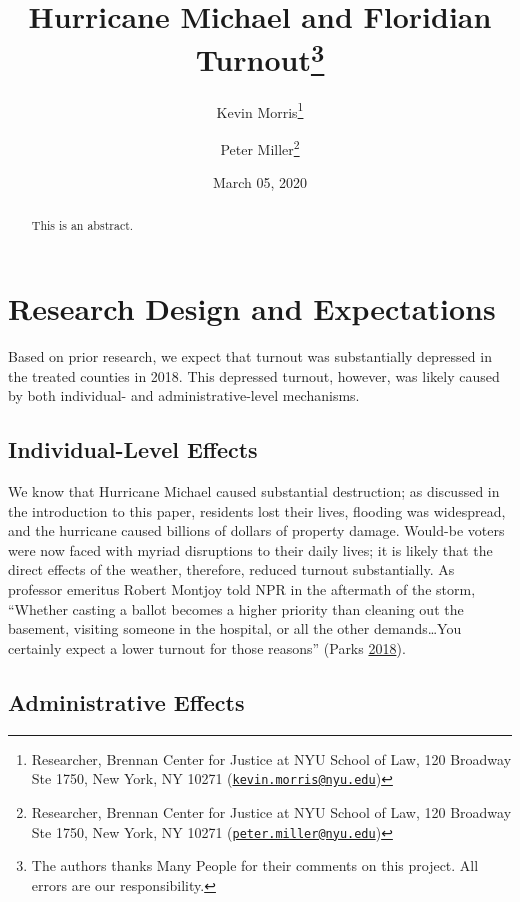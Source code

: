 \documentclass[
  12pt,
]{article}
\title{Hurricane Michael and Floridian Turnout\thanks{The authors thanks Many People for their comments on this project. All errors are our responsibility.}}
\author{Kevin Morris\footnote{Researcher, Brennan Center for Justice at NYU School of Law, 120 Broadway Ste 1750, New York, NY 10271 (\href{mailto:kevin.morris@nyu.edu}{\nolinkurl{kevin.morris@nyu.edu}})} \and Peter Miller\footnote{Researcher, Brennan Center for Justice at NYU School of Law, 120 Broadway Ste 1750, New York, NY 10271 (\href{mailto:peter.miller@nyu.edu}{\nolinkurl{peter.miller@nyu.edu}})}}
\date{March 05, 2020}
\begin{document}
\maketitle
\begin{abstract}
This is an abstract.
\end{abstract}

\pagebreak

\doublespacing

\hypertarget{research-design-and-expectations}{%
\section*{Research Design and Expectations}\label{research-design-and-expectations}}

Based on prior research, we expect that turnout was substantially depressed in the treated counties in 2018. This depressed turnout, however, was likely caused by both individual- and administrative-level mechanisms.

\hypertarget{individual-level-effects}{%
\subsection*{Individual-Level Effects}\label{individual-level-effects}}

We know that Hurricane Michael caused substantial destruction; as discussed in the introduction to this paper, residents lost their lives, flooding was widespread, and the hurricane caused billions of dollars of property damage. Would-be voters were now faced with myriad disruptions to their daily lives; it is likely that the direct effects of the weather, therefore, reduced turnout substantially. As professor emeritus Robert Montjoy told NPR in the aftermath of the storm, ``Whether casting a ballot becomes a higher priority than cleaning out the basement, visiting someone in the hospital, or all the other demands\ldots You certainly expect a lower turnout for those reasons'' (Parks \protect\hyperlink{ref-Parks2018}{2018}).

\hypertarget{administrative-effects}{%
\subsection*{Administrative Effects}\label{administrative-effects}}
\end{document}
